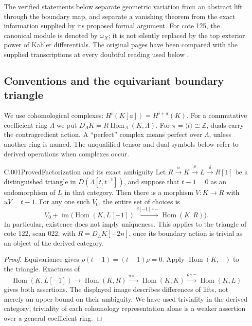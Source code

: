 The verified statements below separate geometric variation from an
abstract lift through the boundary map, and separate a vanishing theorem
from the exact information supplied by its proposed formal argument.
For cote 125, the canonical module is denoted by $\omega_X$; it is
not silently replaced by the top exterior power of Kahler differentials.
The original pages have been compared with the supplied transcriptions
at every doubtful reading used below \cite{C-ms122,C-ms125}.

\subsection{Conventions and the equivariant boundary triangle}
We use cohomological complexes: $H^i(K[a])=H^{i+a}(K)$.
For a commutative coefficient ring $\Lambda$ we put
$D_\Lambda K=R\operatorname{Hom}_\Lambda(K,\Lambda)$.
For $\pi=\langle t\rangle\cong\mathbb Z$, duals carry the contragredient action.
A ``perfect'' complex means perfect over $\Lambda$, unless another ring is named.
The unqualified tensor and dual symbols below refer to derived operations when complexes occur.

\begin{saresult}{C.001}{Proved}{Factorization and its exact ambiguity}
Let $R\xrightarrow{u}K\xrightarrow{\rho}L\xrightarrow{\delta}R[1]$
be a distinguished triangle in $D(\Lambda[t,t^{-1}])$, and suppose that
$t-1=0$ as an endomorphism of $L$ in that category.
Then there is a morphism $V:K\to R$ with $uV=t-1$.
For any one such $V_0$, the entire set of choices is
\[
 V_0+\operatorname{im}\bigl(
 \operatorname{Hom}(K,L[-1])\xrightarrow{\delta[-1]\circ-}
 \operatorname{Hom}(K,R)\bigr).
\]
In particular, existence does not imply uniqueness.
This applies to the triangle of cote 122, scan 022, with
$R=D_\Lambda K[-2n]$, once its boundary action is trivial as an object of the derived category.
\end{saresult}
\begin{proof}
Equivariance gives $\rho(t-1)=(t-1)\rho=0$.
Apply $\operatorname{Hom}(K,-)$ to the triangle. Exactness of
\[
 \operatorname{Hom}(K,L[-1])\longrightarrow
 \operatorname{Hom}(K,R)\xrightarrow{u\circ-}
 \operatorname{Hom}(K,K)\xrightarrow{\rho\circ-}
 \operatorname{Hom}(K,L)
\]
gives both assertions. The displayed image describes differences of lifts, not merely an upper bound on their ambiguity. We have used triviality in the derived category; triviality of each cohomology representation alone is a weaker assertion over a general coefficient ring.
\end{proof}

